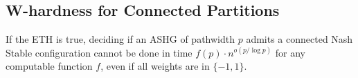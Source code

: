 \documentclass[letterpaper,USenglish,cleveref, autoref, thm-restate]{lipics-v2021}
\begin{document}

\subsection{W-hardness for Connected Partitions}\label{sec:binPack}

\begin{theorem}\label{thm:whard} If the ETH is true, deciding if an ASHG of
pathwidth $p$ admits a connected Nash Stable configuration cannot be done in
time $f(p)\cdot n^{o(p/\log p)}$ for any computable function $f$, even if all
weights are in $\{-1,1\}$.  \end{theorem}
\end{document}
